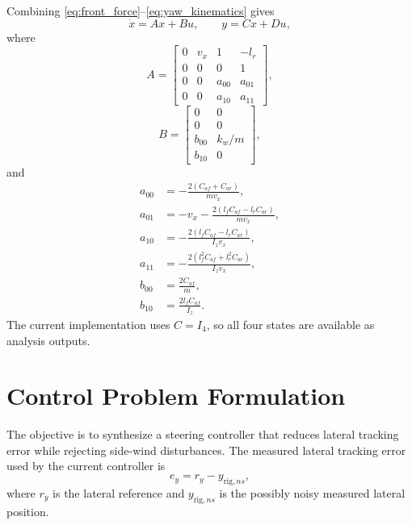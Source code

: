 \documentclass[10pt,twocolumn]{article}
\begin{document}
Combining \eqref{eq:front_force}--\eqref{eq:yaw_kinematics} gives
\begin{equation}
    \dot{x} = A x + B u,
    \qquad
    y = C x + D u ,
\end{equation}
where
\begin{equation}
    A =
    \begin{bmatrix}
        0 & v_x & 1 & -l_r \\
        0 & 0 & 0 & 1 \\
        0 & 0 & a_{00} & a_{01} \\
        0 & 0 & a_{10} & a_{11}
    \end{bmatrix},
\end{equation}
\begin{equation}
    B =
    \begin{bmatrix}
        0 & 0 \\
        0 & 0 \\
        b_{00} & k_w/m \\
        b_{10} & 0
    \end{bmatrix},
\end{equation}
and
\begin{align}
    a_{00} &=
    -\frac{2(C_{af}+C_{ar})}{m v_x},\\
    a_{01} &=
    -v_x
    -\frac{2(l_f C_{af}-l_r C_{ar})}{m v_x},\\
    a_{10} &=
    -\frac{2(l_f C_{af}-l_r C_{ar})}{I_z v_x},\\
    a_{11} &=
    -\frac{2(l_f^2 C_{af}+l_r^2 C_{ar})}{I_z v_x},\\
    b_{00} &= \frac{2C_{af}}{m},\\
    b_{10} &= \frac{2l_f C_{af}}{I_z}.
\end{align}
The current implementation uses $C=I_4$, so all four states are available as
analysis outputs.

\section{Control Problem Formulation}

The objective is to synthesize a steering controller that reduces lateral
tracking error while rejecting side-wind disturbances. The measured lateral
tracking error used by the current controller is
\begin{equation}
    e_y = r_y - y_{\mathrm{rig},ns},
\end{equation}
where $r_y$ is the lateral reference and $y_{\mathrm{rig},ns}$ is the possibly
noisy measured lateral position.
\end{document}

